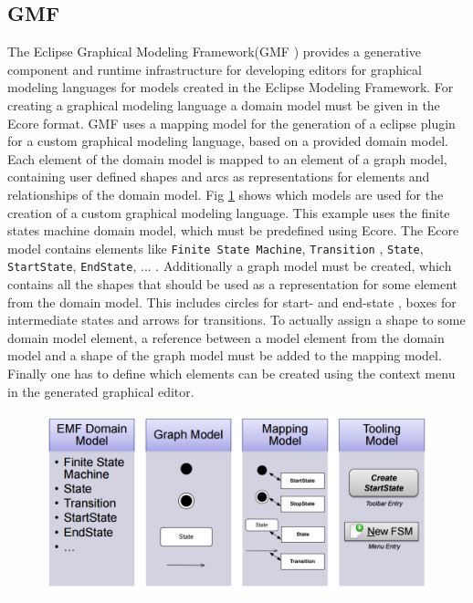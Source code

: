 \documentclass[runningheads,a4paper]{llncs}
\begin{document}
    \subsection{GMF}
    The Eclipse Graphical Modeling Framework(GMF \cite{gmf}) provides a generative component and runtime infrastructure for developing 
    editors for graphical modeling languages for models created in the Eclipse Modeling Framework.
    For creating a graphical modeling language a domain model must be given in the Ecore format.
    GMF uses a mapping model for the generation of a eclipse plugin for a custom graphical modeling language, based on a provided domain model. 
    Each element of the domain model is mapped to an element of a graph model, containing user defined shapes and arcs as representations for elements 
    and relationships of the domain model. Fig \ref{mapmodel} shows which models are used for the creation of a custom graphical modeling language.
    This example uses the finite states machine domain model, which must be predefined using Ecore. 
    The Ecore model contains elements like \texttt{Finite State Machine}, \texttt{Transition} , \texttt{State}, \texttt{StartState}, \texttt{EndState}, ... .
    Additionally a graph model must be created, which contains all the shapes that should be 
    used as a representation for some element from the domain model. This includes circles for start- and  end-state , boxes for intermediate states
    and arrows for transitions. To actually assign a shape to some domain model element, a reference between a model element from the domain model 
    and a shape of the graph model must be added to the mapping model. Finally one has to define which elements can be created using the context 
    menu in the generated graphical editor.
    \begin{figure}[H]
      \centering
      \includegraphics[width=.7\textwidth]{images/TableGMFSteps.PNG}
      \label{mapmodel}
    \end{figure}
    
\end{document}
